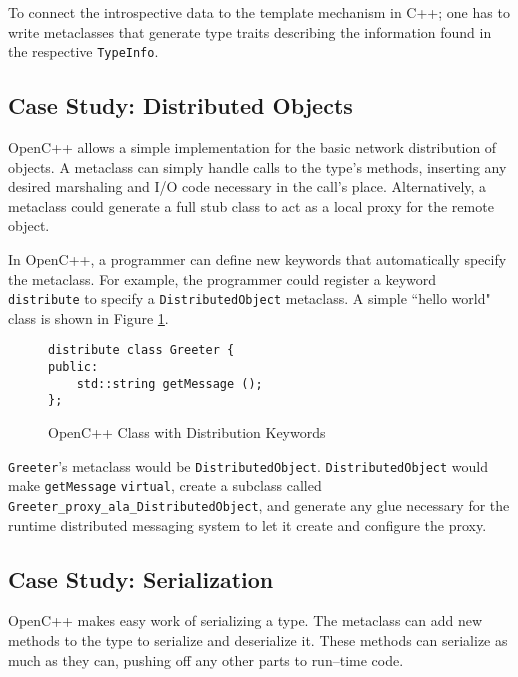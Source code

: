 	To connect the introspective data to the template mechanism in C++; one has to write metaclasses that generate type traits describing the information found in the respective \texttt{TypeInfo}.

	\subsection{Case Study: Distributed Objects}
	OpenC++ allows a simple implementation for the basic network distribution of objects.  A metaclass can simply handle calls to the type's methods, inserting any desired marshaling and I/O code necessary in the call's place.  Alternatively, a metaclass could generate a full stub class to act as a local proxy for the remote object.  

	In OpenC++, a programmer can define new keywords that automatically specify the metaclass.  For example, the programmer could register a keyword \texttt{distribute} to specify a \texttt{DistributedObject} metaclass.  A simple ``hello world" class is shown in Figure \ref{fig:ocpp-dist}.

\begin{figure}[ht!]
\begin{verbatim}
distribute class Greeter {
public:
    std::string getMessage ();
};
\end{verbatim}
\caption{OpenC++ Class with Distribution Keywords}
\label{fig:ocpp-dist}
\end{figure}

	\texttt{Greeter}'s metaclass would be \texttt{Dis\-tr\-ib\-ut\-ed\-Ob\-j\-ect}. \texttt{Dis\-tr\-ib\-ut\-ed\-Ob\-j\-ect} would make \texttt{get\-Mes\-s\-age} \texttt{virtual}, create a subclass called \texttt{Greeter\-\_proxy\-\_ala\-\_Dis\-tr\-ib\-ut\-ed\-Ob\-j\-ect}, and generate any glue necessary for the runtime distributed messaging system to let it create and configure the proxy.

	\subsection{Case Study: Serialization}
	OpenC++ makes easy work of serializing a type.  The metaclass can add new methods to the type to serialize and deserialize it.  These methods can serialize as much as they can, pushing off any other parts to run--time code.  

